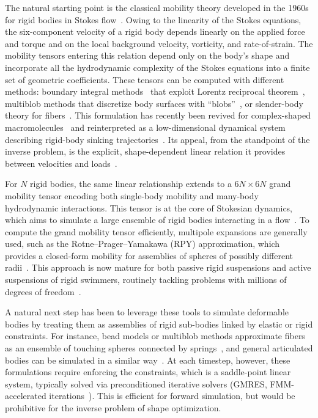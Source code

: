 \documentclass[aps,prfluids,groupedaddress]{revtex4-2}
\begin{document}
The natural starting point is the classical mobility theory developed in the 1960s for rigid bodies in Stokes flow~\cite{Brenner1963,Happel2012,Kim2013}. 
Owing to the linearity of the Stokes equations, the six-component velocity of a rigid body depends linearly on the applied force and torque and on the local background velocity, vorticity, and rate-of-strain. 
The mobility tensors entering this relation depend only on the body's shape and incorporate all the hydrodynamic complexity of the Stokes equations into a finite set of geometric coefficients. 
These tensors can be computed with different methods: boundary integral methods~\cite{Pozrikidis1992} that exploit Lorentz reciprocal theorem~\cite{Happel2012}, multiblob methods that discretize body surfaces with ``blobs''~\cite{Balboa-Usabiaga2017,Balboa-Usabiaga2022,Broms2023}, or slender-body theory for fibers~\cite{Tornberg2004,Nazockdast2017,Maxian2022}.
This formulation has recently been revived for complex-shaped macromolecules~\cite{Garcia-de-la-Torre1981,Zuk2014,Zuk2018} and reinterpreted as a low-dimensional dynamical system describing rigid-body sinking trajectories~\cite{Gonzalez2004,Witten2020}.
Its appeal, from the standpoint of the inverse problem, is the explicit, shape-dependent linear relation it provides between velocities and loads~\cite{Moreau2022}.

For $N$ rigid bodies, the same linear relationship extends to a $6N\times 6N$ grand mobility tensor encoding both single-body mobility and many-body hydrodynamic interactions. 
This tensor is at the core of Stokesian dynamics, which aims to simulate a large ensemble of rigid bodies interacting in a flow~\cite{Brady1988,Ichiki2002,Fiore2019,Swan2016}. 
To compute the grand mobility tensor efficiently, multipole expansions are generally used, such as the Rotne--Prager--Yamakawa (RPY) approximation, which provides a closed-form mobility for assemblies of spheres of possibly different radii~\cite{Rotne1969,Yamakawa1970,Wajnryb2013,Zuk2014,Cichocki2021}.
This approach is now mature for both passive rigid suspensions and active suspensions of rigid swimmers, routinely tackling problems with millions of degrees of freedom~\cite{Delmotte2015b}. 

A natural next step has been to leverage these tools to simulate deformable bodies by treating them as assemblies of rigid
sub-bodies linked by elastic or rigid constraints. 
For instance, bead models or multiblob methods approximate fibers as an ensemble of touching spheres connected by springs~\cite{Delmotte2015,Zuk2021,Fuchter2023}, and general articulated bodies can be simulated in a similar way~\cite{Balboa-Usabiaga2022}. 
At each timestep, however, these formulations require enforcing the constraints, which is a saddle-point linear system, typically solved via preconditioned iterative solvers (GMRES, FMM-accelerated iterations~\cite{Liang2013,Fiore2019}). 
This is efficient for forward simulation, but would be prohibitive for the inverse problem of shape optimization.
\end{document}
